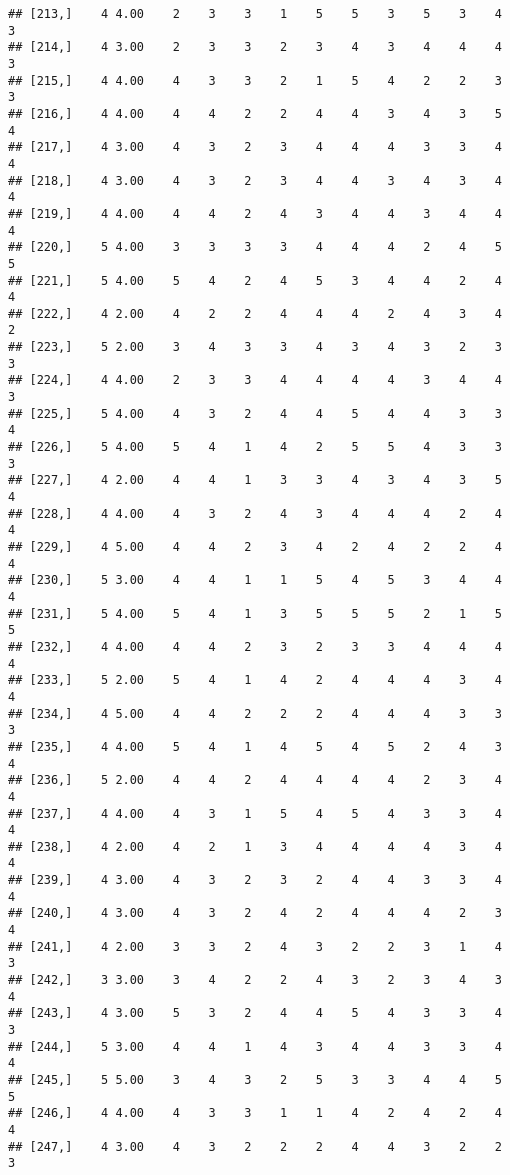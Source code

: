 \documentclass[]{article}
\begin{document}
\begin{verbatim}
## [213,]    4 4.00    2    3    3    1    5    5    3    5    3    4    3
## [214,]    4 3.00    2    3    3    2    3    4    3    4    4    4    3
## [215,]    4 4.00    4    3    3    2    1    5    4    2    2    3    3
## [216,]    4 4.00    4    4    2    2    4    4    3    4    3    5    4
## [217,]    4 3.00    4    3    2    3    4    4    4    3    3    4    4
## [218,]    4 3.00    4    3    2    3    4    4    3    4    3    4    4
## [219,]    4 4.00    4    4    2    4    3    4    4    3    4    4    4
## [220,]    5 4.00    3    3    3    3    4    4    4    2    4    5    5
## [221,]    5 4.00    5    4    2    4    5    3    4    4    2    4    4
## [222,]    4 2.00    4    2    2    4    4    4    2    4    3    4    2
## [223,]    5 2.00    3    4    3    3    4    3    4    3    2    3    3
## [224,]    4 4.00    2    3    3    4    4    4    4    3    4    4    3
## [225,]    5 4.00    4    3    2    4    4    5    4    4    3    3    4
## [226,]    5 4.00    5    4    1    4    2    5    5    4    3    3    3
## [227,]    4 2.00    4    4    1    3    3    4    3    4    3    5    4
## [228,]    4 4.00    4    3    2    4    3    4    4    4    2    4    4
## [229,]    4 5.00    4    4    2    3    4    2    4    2    2    4    4
## [230,]    5 3.00    4    4    1    1    5    4    5    3    4    4    4
## [231,]    5 4.00    5    4    1    3    5    5    5    2    1    5    5
## [232,]    4 4.00    4    4    2    3    2    3    3    4    4    4    4
## [233,]    5 2.00    5    4    1    4    2    4    4    4    3    4    4
## [234,]    4 5.00    4    4    2    2    2    4    4    4    3    3    3
## [235,]    4 4.00    5    4    1    4    5    4    5    2    4    3    4
## [236,]    5 2.00    4    4    2    4    4    4    4    2    3    4    4
## [237,]    4 4.00    4    3    1    5    4    5    4    3    3    4    4
## [238,]    4 2.00    4    2    1    3    4    4    4    4    3    4    4
## [239,]    4 3.00    4    3    2    3    2    4    4    3    3    4    4
## [240,]    4 3.00    4    3    2    4    2    4    4    4    2    3    4
## [241,]    4 2.00    3    3    2    4    3    2    2    3    1    4    3
## [242,]    3 3.00    3    4    2    2    4    3    2    3    4    3    4
## [243,]    4 3.00    5    3    2    4    4    5    4    3    3    4    3
## [244,]    5 3.00    4    4    1    4    3    4    4    3    3    4    4
## [245,]    5 5.00    3    4    3    2    5    3    3    4    4    5    5
## [246,]    4 4.00    4    3    3    1    1    4    2    4    2    4    4
## [247,]    4 3.00    4    3    2    2    2    4    4    3    2    2    3

\end{verbatim}
\end{document}
